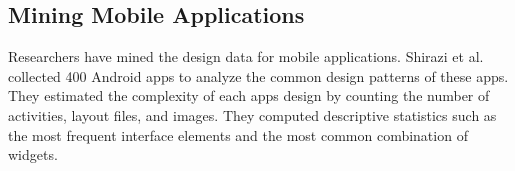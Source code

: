 \subsection{Mining Mobile Applications}

Researchers have mined the design data for mobile applications.
Shirazi et al. \cite{shirazi_EICS_2013} collected 400 Android apps to analyze the common design patterns of these apps.
They estimated the complexity of each apps design by counting the number of activities, layout files, and images.
They computed descriptive statistics such as the most frequent interface elements and the most common combination of widgets.